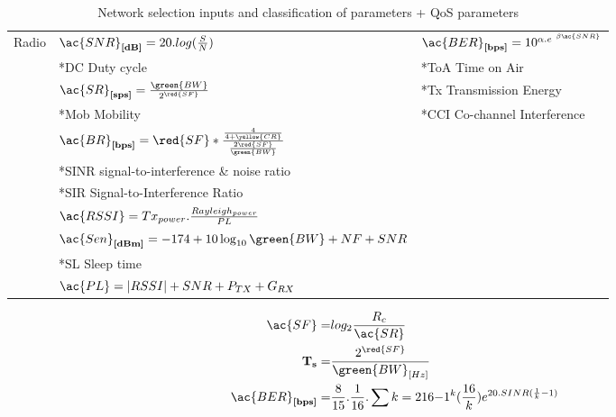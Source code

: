 \begin{table}[h]
\begin{tabular}{l|l|l}
	Radio 				       			& $\ac{SNR}_{\textbf{[dB]}}= 20.log(\frac{S}{N})$																				& $\ac{BER}_{\textbf{[bps]}}   = 10^{\alpha .e^{\ \beta \tiny\ac{SNR}}}$\\
	\							        & *\ac{DC} Duty cycle                            		  																		& *\ac{ToA}  Time on Air          		      							\\
	\							        & $\ac{SR}_{\textbf{[sps]}}= \frac{\green{BW}}{2^{\red{SF}}}$ 																	& *\ac{Tx} Transmission Energy   										\\
	\							        & *\ac{Mob} Mobility									  																		& *\ac{CCI} Co-channel Interference										\\
	\							        & $\ac{BR}_{\textbf{[bps]}} = \red{SF} * \frac{\frac{4}{4+\yellow{CR}}}{\frac{2 \red{SF}}{\green{BW}}}$ 						& 														\\
	\									& *\ac{SINR} signal-to-interference \& noise ratio 	 	 																		& 																		\\
	\									& *\ac{SIR} Signal-to-Interference Ratio 				  																		& 																		\\
	\									& $\ac{RSSI} = Tx_{power}.\frac{Rayleigh_{power}}{PL}$	 																		& 																		\\
	\									& \cite{barro_lorawan_2019} $\ac{Sen}_{\textbf{[dBm]}} = -174+10 \log _{10} \green{BW} + NF + SNR$ 								& 																		\\
	\									& *\ac{SL} Sleep time																											& 																		\\
	\									& \cite{petajajarvi_coverage_2015} $\ac{PL}=|R S S I|+S N R+P_{T X}+G_{R X}$													& 																		\\
	\end{tabular}
\caption{\label{tab:scheduling} Network selection inputs and classification of parameters \cite{bendaoud_network_2019} + QoS parameters \cite{meshinchi_qosaware_2018} \cite{chowdhury_survey_2018}}
\end{table}

\begin{align}
\ac{SF}                     =& log_{2} \frac{R_{c}}{\ac{SR}}\\
\textbf{T}_{\textbf{s}}     =& \frac{2^{\red{SF}}}{\green{BW}_{[Hz]}}\\
\ac{BER}_{\textbf{[bps]}}   =& \frac{8}{15}.\frac{1}{16}.\sum{k=2}{16}{-1^{k}(\frac{16}{k})e^{20.SINR(\frac{1}{k}-1)}}\\
\end{align}




